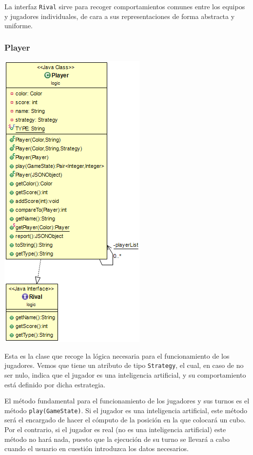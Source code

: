 \documentclass[12pt,a4paper,openright]{book}
\theoremstyle{break}
\begin{document}
La interfaz \texttt{Rival} sirve para recoger comportamientos comunes entre los equipos y jugadores individuales, de cara a sus representaciones de forma abstracta y uniforme.

\newpage

\subsubsection{Player}

\begin{center}
\includegraphics[scale=0.75]{Player-sprint7.png} 
\end{center}

Esta es la clase que recoge la lógica necesaria para el funcionamiento de los jugadores. Vemos que tiene un atributo de tipo \texttt{Strategy}, el cual, en caso de no ser nulo, indica que el jugador es una inteligencia artificial, y su comportamiento está definido por dicha estrategia.

El método fundamental para el funcionamiento de los jugadores y sus turnos es el método \texttt{play(GameState)}. Si el jugador es una inteligencia artificial, este método será el encargado de hacer el cómputo de la posición en la que colocará un cubo. Por el contrario, si el jugador es real (no es una inteligencia artificial) este método no hará nada, puesto que la ejecución de su turno se llevará a cabo cuando el usuario en cuestión introduzca los datos necesarios.
\end{document}
